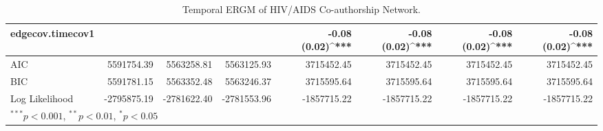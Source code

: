 \begin{table}
\begin{center}
\begin{tabular}{l D{)}{)}{11)3} D{)}{)}{11)3} D{)}{)}{11)3} D{)}{)}{11)3} D{)}{)}{11)3} D{)}{)}{11)3} D{)}{)}{11)3} }
edgecov.timecov1               &                       &                       &                       & -0.08 \; (0.02)^{***} & -0.08 \; (0.02)^{***} & -0.08 \; (0.02)^{***} & -0.08 \; (0.02)^{***} \\
\midrule
AIC                            & 5591754.39            & 5563258.81            & 5563125.93            & 3715452.45            & 3715452.45            & 3715452.45            & 3715452.45            \\
BIC                            & 5591781.15            & 5563352.48            & 5563246.37            & 3715595.64            & 3715595.64            & 3715595.64            & 3715595.64            \\
Log Likelihood                 & -2795875.19           & -2781622.40           & -2781553.96           & -1857715.22           & -1857715.22           & -1857715.22           & -1857715.22           \\
\bottomrule
{}
\end{tabular}
\caption{Temporal ERGM of HIV/AIDS Co-authorship Network.}
\label{tab:hiv_tergm}
\end{center}
\end{table}
